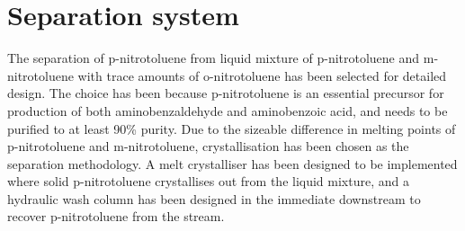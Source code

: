 \section*{Separation system}

The separation of p-nitrotoluene from liquid mixture of p-nitrotoluene and m-nitrotoluene with trace amounts of o-nitrotoluene has been selected for detailed design. The choice has been because p-nitrotoluene is an essential precursor for production of both aminobenzaldehyde and aminobenzoic acid, and needs to be purified to at least 90\% purity. Due to the sizeable difference in melting points of p-nitrotoluene and m-nitrotoluene, crystallisation has been chosen as the separation methodology. A melt crystalliser has been designed to be implemented  where solid p-nitrotoluene crystallises out from the liquid mixture, and a hydraulic wash column has been designed in the immediate downstream to recover p-nitrotoluene from the stream. 